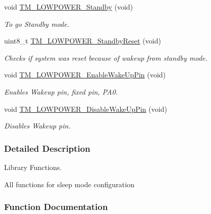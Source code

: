 \begin{DoxyCompactItemize}
void \hyperlink{group___t_m___l_o_w_p_o_w_e_r___functions_ga80d88be15aa15b16681fa46cc49d25e2}{T\+M\+\_\+\+L\+O\+W\+P\+O\+W\+E\+R\+\_\+\+Standby} (void)
\begin{DoxyCompactList}\small\item\em To go Standby mode. \end{DoxyCompactList}\item 
uint8\+\_\+t \hyperlink{group___t_m___l_o_w_p_o_w_e_r___functions_gaef5251d969255825dfd430b7239c93d4}{T\+M\+\_\+\+L\+O\+W\+P\+O\+W\+E\+R\+\_\+\+Standby\+Reset} (void)
\begin{DoxyCompactList}\small\item\em Checks if system was reset because of wakeup from standby mode. \end{DoxyCompactList}\item 
void \hyperlink{group___t_m___l_o_w_p_o_w_e_r___functions_gab69784956d57ac303e60ff2766af9671}{T\+M\+\_\+\+L\+O\+W\+P\+O\+W\+E\+R\+\_\+\+Enable\+Wake\+Up\+Pin} (void)
\begin{DoxyCompactList}\small\item\em Enables Wakeup pin, fixed pin, P\+A0. \end{DoxyCompactList}\item 
void \hyperlink{group___t_m___l_o_w_p_o_w_e_r___functions_ga522159a613fd2a682d29b8e8938a8bf9}{T\+M\+\_\+\+L\+O\+W\+P\+O\+W\+E\+R\+\_\+\+Disable\+Wake\+Up\+Pin} (void)
\begin{DoxyCompactList}\small\item\em Disables Wakeup pin. \end{DoxyCompactList}\end{DoxyCompactItemize}


\subsubsection{Detailed Description}
Library Functions. 

All functions for sleep mode configuration 

\subsubsection{Function Documentation}
\hypertarget{group___t_m___l_o_w_p_o_w_e_r___functions_ga522159a613fd2a682d29b8e8938a8bf9}{}
